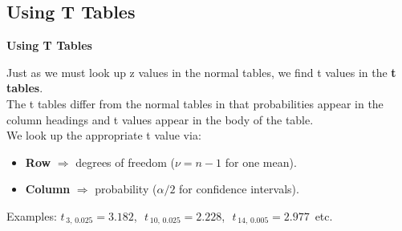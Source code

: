 \documentclass[compress]{beamer}        %
\makeatletter
\newcommand{\tcb}{\textcolor{beamer@blendedblue}}
\makeatother
\begin{document}
\subsection{Using T Tables}
\begin{frame}{\bf \tcb{Using T Tables}}

Just as we must look up z values in the normal tables, we find t values in the {\bf t tables}.\\[0.6cm]

The t tables differ from the normal tables in that probabilities appear in the column headings and t values appear in the body of the table.\\[0.6cm]

We look up the appropriate t value via:\\[0.1cm]
\begin{itemize}\itemsep0.4cm
\item {\bf Row} $\Rightarrow$ degrees of freedom ($\nu =n-1$ for one mean).
\item {\bf Column} $\Rightarrow$ probability ($\alpha/2$ for confidence intervals).\\[0.6cm]
\end{itemize}

Examples: $t_{\,3,\,0.025}=3.182$,\,\, $t_{\,10,\,0.025}=2.228$,\,\, $t_{\,14,\,0.005}=2.977$\, etc.

\end{frame}
\end{document}
